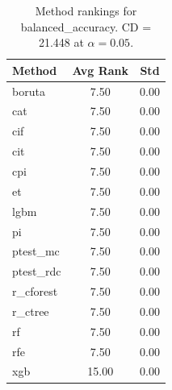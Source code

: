 \begin{table}[h]
\centering
\caption{Method rankings for balanced_accuracy. CD = 21.448 at $\alpha=0.05$.}
\label{tab:ranks_balanced_accuracy}
\begin{tabular}{lcc}
\toprule
Method & Avg Rank & Std \\
\midrule
boruta & 7.50 & 0.00 \\
cat & 7.50 & 0.00 \\
cif & 7.50 & 0.00 \\
cit & 7.50 & 0.00 \\
cpi & 7.50 & 0.00 \\
et & 7.50 & 0.00 \\
lgbm & 7.50 & 0.00 \\
pi & 7.50 & 0.00 \\
ptest_mc & 7.50 & 0.00 \\
ptest_rdc & 7.50 & 0.00 \\
r_cforest & 7.50 & 0.00 \\
r_ctree & 7.50 & 0.00 \\
rf & 7.50 & 0.00 \\
rfe & 7.50 & 0.00 \\
xgb & 15.00 & 0.00 \\
\bottomrule
\end{tabular}
\end{table}